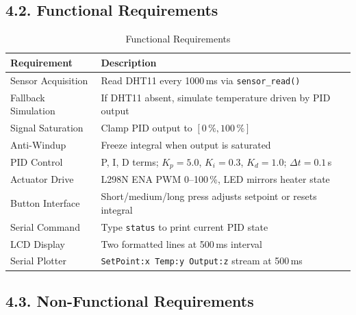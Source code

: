 \documentclass[12pt]{article}
\begin{document}
\subsection*{4.2. Functional Requirements}

\begin{table}[H]
    \centering
    \caption{Functional Requirements}
    \begin{tabular}{|l|l|}
        \hline
        \textbf{Requirement} & \textbf{Description} \\
        \hline
        Sensor Acquisition & Read DHT11 every 1000\,ms via \texttt{sensor\_read()} \\
        \hline
        Fallback Simulation & If DHT11 absent, simulate temperature driven by PID output \\
        \hline
        Signal Saturation & Clamp PID output to $[0\,\%, 100\,\%]$ \\
        \hline
        Anti-Windup & Freeze integral when output is saturated \\
        \hline
        PID Control & P, I, D terms; $K_p=5.0$, $K_i=0.3$, $K_d=1.0$; $\Delta t=0.1$\,s \\
        \hline
        Actuator Drive & L298N ENA PWM 0--100\,\%, LED mirrors heater state \\
        \hline
        Button Interface & Short/medium/long press adjusts setpoint or resets integral \\
        \hline
        Serial Command & Type \texttt{status} to print current PID state \\
        \hline
        LCD Display & Two formatted lines at 500\,ms interval \\
        \hline
        Serial Plotter & \texttt{SetPoint:x Temp:y Output:z} stream at 500\,ms \\
        \hline
    \end{tabular}
\end{table}

\subsection*{4.3. Non-Functional Requirements}
\end{document}
